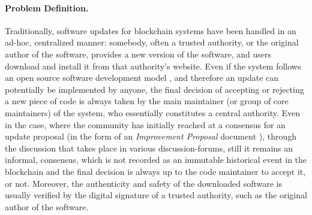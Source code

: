 

\paragraph{Problem Definition.} 
Traditionally, software updates for blockchain systems have been handled in an ad-hoc, centralized manner: somebody, often a trusted authority, or the original author of the software, provides a new version of the software, and users
download and install it from that authority's website. Even if the system follows an open source software development model , and therefore an update can potentially be implemented by anyone, the final decision of accepting or rejecting a new piece of code is always taken by the main maintainer (or group of core maintainers) of the system, who essentially constitutes a central authority. Even in the case, where the community has initially reached at a consensus for an update proposal (in the form of an \emph{Improvement Proposal} document ), through the discussion that takes place in various discussion-forums, still it remains an informal,  consensus, which is not recorded as an immutable historical event in the blockchain and the final decision is always up to the code maintainer to accept it, or not. Moreover, the authenticity and safety of the downloaded software is usually verified by the digital signature of a trusted authority, such as the original author of the software.

